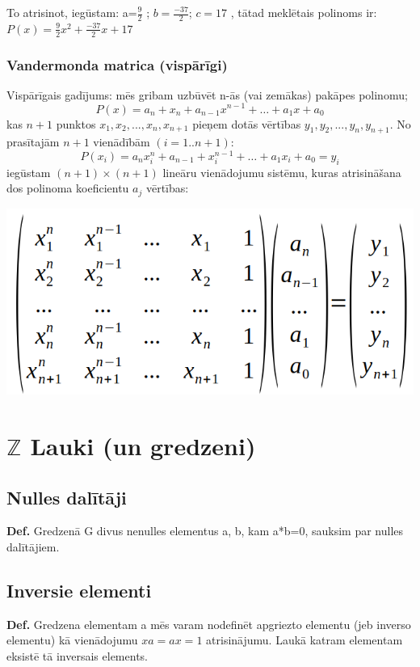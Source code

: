 \documentclass{article}
\begin{document}
To atrisinot, iegūstam: a=$\frac{9}{2}$ ; $b=\frac{-37}{2}$; $c=17$ , tātad meklētais polinoms ir: $P(x)=\frac{9}{2} x^2 +\frac{-37}{2}x+17$ 

\subsubsection{Vandermonda matrica (vispārīgi)}

Vispārīgais gadījums: mēs gribam uzbūvēt n-ās (vai zemākas) pakāpes polinomu;
\begin{equation}
	P(x)=a_n+ x_n +a_{n-1}x^{n-1} +\ldots +a_1x+a_0
\end{equation}
kas $n+1$ punktos $x_1 , x_2 ,... , x_n , x_{n+1}$ pieņem dotās vērtības $y_1 , y_2 , ... , y_n , y_{n+1} $.
No prasītajām $n+1$ vienādībām $(i=1..n+1)$:
\begin{equation}
	P(x_i)=a_nx_i^n+a_{n-1}+x_i^{n-1} +\ldots+a_1x_i+a_0= y_i
\end{equation}
iegūstam $(n+1)\times(n+1)$ lineāru vienādojumu sistēmu, kuras atrisināšana dos polinoma koeficientu $a_j$ vērtības:

\begin{center}
	\includegraphics[width=0.5\linewidth]{Vandermond_matrix-1}
\end{center}

\section{$\mathbb{Z}$ Lauki (un gredzeni)}

\subsection{Nulles dalītāji}

\textbf{Def.} Gredzenā G divus nenulles elementus a, b, kam a*b=0, sauksim par nulles dalītājiem.

\subsection{Inversie elementi}

\textbf{Def.} Gredzena elementam a mēs varam nodefinēt apgriezto elementu (jeb inverso elementu) kā vienādojumu $xa=ax=1$ atrisinājumu.
Laukā katram elementam eksistē tā inversais elements.
\end{document}
